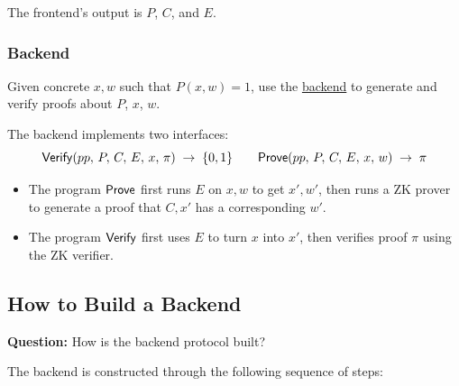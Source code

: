 \documentclass[11pt]{article}
\begin{document}
The frontend's output is $P$, $C$, and $E$.

\subsubsection*{Backend}

Given concrete $x, w$ such that $P(x, w) = 1$, use the \underline{backend} to generate and verify proofs about $P$, $x$, $w$.

The backend implements two interfaces:
\[
  \mathsf{Verify}(pp,\, P,\, C,\, E,\, x,\, \pi) \;\to\; \{0,1\}
  \qquad
  \mathsf{Prove}(pp,\, P,\, C,\, E,\, x,\, w) \;\to\; \pi
\]

\begin{itemize}
  \item The program $\mathsf{Prove}$ first runs $E$ on $x, w$ to get $x', w'$, then runs a ZK prover to
        generate a proof that $C, x'$ has a corresponding $w'$.
  \item The program $\mathsf{Verify}$ first uses $E$ to turn $x$ into $x'$, then verifies proof $\pi$ using
        the ZK verifier.
\end{itemize}

\subsection{How to Build a Backend}

\begin{tcolorbox}[colback=blue!5!white, colframe=blue!50!black, title={Central Question}]
  \textbf{Question:} How is the backend protocol built?
\end{tcolorbox}

\medskip
The backend is constructed through the following sequence of steps:
\end{document}
